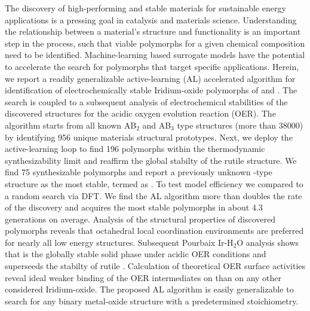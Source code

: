 %


%
\noindent The discovery of high-performing and stable materials for sustainable energy applications is a pressing goal in catalysis and materials science. Understanding the relationship between a material's structure and functionality is an important step in the process, such that viable polymorphs for a given chemical composition need to be identified.
%
Machine-learning based surrogate models have the potential to accelerate the search for polymorphs that target specific applications.
Herein, we report a readily generalizable active-learning (AL) accelerated algorithm for identification of electrochemically stable Iridium-oxide polymorphs of \IrOtwo and \IrOthree. The search is coupled to a subsequent analysis of electrochemical stabilities of the discovered structures for the acidic oxygen evolution reaction (OER).
The algorithm starts from all known AB$_2$ and AB$_3$ type structures (more than \num{38000}) by identifying 956 unique materials structural prototypes. Next, we deploy the active-learning loop to  find \num{196} \IrOtwo polymorphs within the thermodynamic synthesizability limit and reaffirm the global stabilty of the rutile structure. We find \num{75} synthesizable \IrOthree polymorphs and report a previously unknown -type structure as the most stable, termed as \aIrOthree. To test model efficiency we compared to a random search via DFT. We find the AL algorithm more than doubles the rate of the discovery and acquires the most stable polymorphs in about \num{4.3} generations on average. %
Analysis of the structural properties of discovered polymorphs reveals that octahedral local coordination environments are preferred for nearly all low energy structures. Subsequent Pourbaix Ir-H$_2$O analysis shows that \aIrOthree is the globally stable solid phase under acidic OER conditions and superseeds the stabilty of rutile \IrOtwo. 
Calculation of theoretical OER surface activities reveal ideal
weaker binding of the OER intermediates on \aIrOthree than on any other considered Iridium-oxide. The proposed AL algorithm  is easily generalizable to search for any binary metal-oxide structure with a predetermined stoichiometry.  





